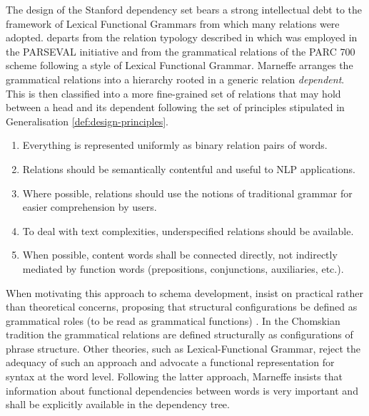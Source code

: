     The design of the Stanford dependency set \citep{Marneffe2006, Marneffe2008,  Marneffe2014, Silveira2014} bears a strong intellectual debt to the framework of Lexical Functional Grammars \citep{bresnan2015lexical} from which many relations  were adopted. \citet{Marneffe2006} departs from the relation typology described in \citet{Carroll1999} which was employed in the PARSEVAL initiative \citep{Harrison1991} and from the grammatical relations of the PARC 700 \citep{King2003} scheme following a style of Lexical Functional Grammar. Marneffe arranges the grammatical relations into a hierarchy rooted in a generic relation \textit{dependent}. This is then classified into a more fine-grained set of relations that may hold between a head and its dependent following the set of principles \citep{Marneffe2008a} stipulated in Generalisation \ref{def:design-principles}.

    \begin{generalization}\label{def:design-principles}\leavevmode
        \begin{enumerate}
            \item Everything is represented uniformly as binary relation pairs of words.
            \item Relations should be semantically contentful and useful to NLP applications.
            \item Where possible, relations should use the notions of traditional grammar \citep{Quirk1985} for easier comprehension by users.
            \item To deal with text complexities, underspecified relations should be available.
            \item When possible, content words shall be connected directly, not indirectly mediated by function words (prepositions, conjunctions, auxiliaries, etc.).
        \end{enumerate}
    \end{generalization}

    When motivating this approach to schema development, \citet{Marneffe2006} insist on practical rather than theoretical concerns, proposing that structural configurations be defined as grammatical roles (to be read as grammatical functions) \citep{Marneffe2006}. In the Chomskian tradition \citet{Chomsky1957} the grammatical relations are defined structurally as configurations of phrase structure. Other theories, such as Lexical-Functional Grammar, reject the adequacy of such an approach \citep{bresnan2015lexical} and advocate a functional representation for syntax at the word level. Following the latter approach, Marneffe insists that information about functional dependencies between words is very important and shall be explicitly available in the dependency tree. 

